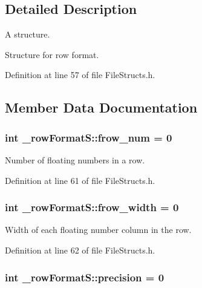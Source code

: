 \subsection{Detailed Description}
A structure. 

Structure for row format. 

Definition at line 57 of file File\+Structs.\+h.



\subsection{Member Data Documentation}
\subsubsection[{\texorpdfstring{frow\+\_\+num}{frow_num}}]{\setlength{\rightskip}{0pt plus 5cm}int \+\_\+row\+Format\+S\+::frow\+\_\+num = 0}\hypertarget{struct__row_format_s_a5a9d061cbfd29e54026f22a6577b1c51}{}\label{struct__row_format_s_a5a9d061cbfd29e54026f22a6577b1c51}


Number of floating numbers in a row. 



Definition at line 61 of file File\+Structs.\+h.

\subsubsection[{\texorpdfstring{frow\+\_\+width}{frow_width}}]{\setlength{\rightskip}{0pt plus 5cm}int \+\_\+row\+Format\+S\+::frow\+\_\+width = 0}\hypertarget{struct__row_format_s_ad8290b8370984dfd0fe1d47329415e57}{}\label{struct__row_format_s_ad8290b8370984dfd0fe1d47329415e57}


Width of each floating number column in the row. 



Definition at line 62 of file File\+Structs.\+h.

\subsubsection[{\texorpdfstring{precision}{precision}}]{\setlength{\rightskip}{0pt plus 5cm}int \+\_\+row\+Format\+S\+::precision = 0}\hypertarget{struct__row_format_s_afd1ddfa4acdc5ea24e031d38ec6dbc77}{}\label{struct__row_format_s_afd1ddfa4acdc5ea24e031d38ec6dbc77}


